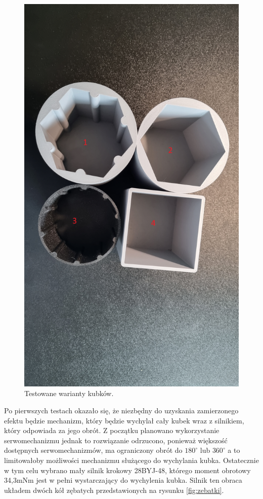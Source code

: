 \begin{figure}[H]
    \centering
    \includegraphics[width=0.65\linewidth, trim={35mm 380mm 20mm 240mm}, clip]{chapters/03-praca-wlasna/figures/kubki.jpg}
    \caption{\label{fig:kubki}Testowane warianty kubków.}
\end{figure}

Po pierwszych testach okazało się, że niezbędny do uzyskania zamierzonego efektu będzie mechanizm, który będzie 
wychylał cały kubek wraz z silnikiem, który odpowiada za jego obrót. Z początku planowano wykorzystanie
serwomechanizmu jednak to rozwiązanie odrzucono, ponieważ większość dostępnych serwomechanizmów, ma
ograniczony obrót do $180^{\circ}$ lub $360^{\circ}$ a to limitowałoby możliwości mechanizmu służącego do wychylania kubka.
Ostatecznie w tym celu wybrano mały silnik krokowy 28BYJ-48, którego moment obrotowy 34,3mNm jest w pełni wystarczający do wychylenia kubka. 
Silnik ten obraca układem dwóch kół zębatych przedstawionych na rysunku \ref{fig:zebatki}.

